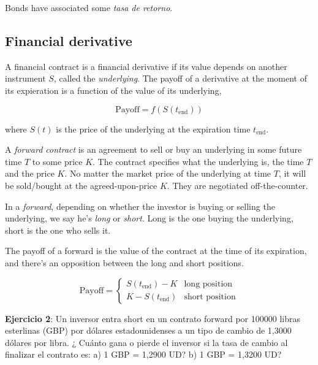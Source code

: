 \documentclass[a4paper, 12pt]{article}
\theoremstyle{definition}
\begin{document}
Bonds have associated some \textit{tasa de retorno}.

\subsection{Financial derivative}

A financial contract is a financial derivative if its value depends on another
instrument $S$, called the \textit{underlying}. The payoff of a derivative at
the moment of its expieration is a function of the value of its underlying, 

\begin{equation}
    \text{Payoff} = f\left( S(t_{\text{end}}) \right) 
\end{equation}

where $S(t)$ is the price of the underlying at the expiration time
$t_{\text{end}}$.

A \textit{forward contract} is an agreement to sell or buy an underlying
in some future time $T$ to some price $K$. The contract specifies what the
underlying is, the time $T$ and the price $K$. No matter the market price of the
underlying at time $T$, it will be sold/bought at the agreed-upon-price $K$.
They are negotiated off-the-counter. 

In a \textit{forward}, depending on whether the investor is buying or selling
the underlying, we say he's \textit{long} or \textit{short}. Long is the one
buying the underlying, short is the one who sells it.

The payoff of a forward is the value of the contract at the time of its
expiration, and there's an opposition between the long and short positions. 

\begin{equation}
    \text{Payoff} = \begin{cases}
        S(t_{\text{end}}) - K & \text{long position}\\ 
        K - S(t_{\text{end}}) & \text{short position}
    \end{cases}
\end{equation}

\pagebreak 

\begin{shaded}
    \textbf{Ejercicio 2}: Un inversor entra short en un contrato forward por 100000 libras
    esterlinas (GBP) por dólares estadounidenses a un tipo de cambio de 1,3000
    dólares por libra. ¿ Cuánto gana o pierde el inversor si la tasa de cambio al
    finalizar el contrato es: a) 1 GBP = 1,2900 UD? b) 1 GBP = 1,3200 UD?
\end{shaded}
\end{document}
